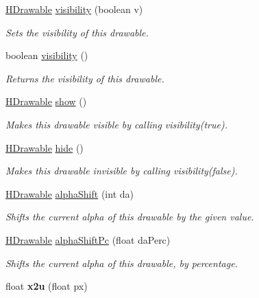 \begin{DoxyCompactItemize}
\hyperlink{classhype_1_1core_1_1drawable_1_1_h_drawable}{H\-Drawable} \hyperlink{classhype_1_1core_1_1drawable_1_1_h_drawable_abad4b596d0577a3655ff0827aac62ee2}{visibility} (boolean v)
\begin{DoxyCompactList}\small\item\em Sets the visibility of this drawable. \end{DoxyCompactList}\item 
boolean \hyperlink{classhype_1_1core_1_1drawable_1_1_h_drawable_af123e1795e471825ca608a2b90e88163}{visibility} ()
\begin{DoxyCompactList}\small\item\em Returns the visibility of this drawable. \end{DoxyCompactList}\item 
\hyperlink{classhype_1_1core_1_1drawable_1_1_h_drawable}{H\-Drawable} \hyperlink{classhype_1_1core_1_1drawable_1_1_h_drawable_acab0f90892d84b754e9cc769ba9dc177}{show} ()
\begin{DoxyCompactList}\small\item\em Makes this drawable visible by calling {\ttfamily visibility(true)}. \end{DoxyCompactList}\item 
\hyperlink{classhype_1_1core_1_1drawable_1_1_h_drawable}{H\-Drawable} \hyperlink{classhype_1_1core_1_1drawable_1_1_h_drawable_a39dff6aef37343a177538d61ae751fb3}{hide} ()
\begin{DoxyCompactList}\small\item\em Makes this drawable invisible by calling {\ttfamily visibility(false)}. \end{DoxyCompactList}\item 
\hyperlink{classhype_1_1core_1_1drawable_1_1_h_drawable}{H\-Drawable} \hyperlink{classhype_1_1core_1_1drawable_1_1_h_drawable_a79d1c2ca4a8f1744b1625907213db1c6}{alpha\-Shift} (int da)
\begin{DoxyCompactList}\small\item\em Shifts the current alpha of this drawable by the given value. \end{DoxyCompactList}\item 
\hyperlink{classhype_1_1core_1_1drawable_1_1_h_drawable}{H\-Drawable} \hyperlink{classhype_1_1core_1_1drawable_1_1_h_drawable_acee05e5733f918b5899a651cd8c7e1bf}{alpha\-Shift\-Pc} (float da\-Perc)
\begin{DoxyCompactList}\small\item\em Shifts the current alpha of this drawable, by percentage. \end{DoxyCompactList}\item 
\hypertarget{classhype_1_1core_1_1drawable_1_1_h_drawable_aefc0cf9066fe2bf147a4178b7c6bf192}{float {\bfseries x2u} (float px)}\label{classhype_1_1core_1_1drawable_1_1_h_drawable_aefc0cf9066fe2bf147a4178b7c6bf192}


\end{DoxyCompactItemize}
